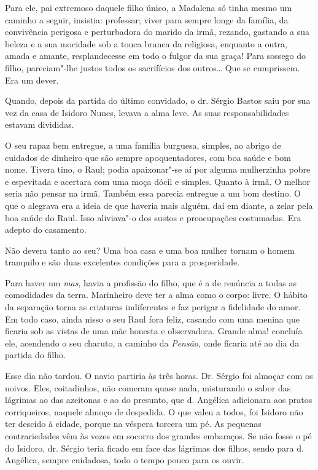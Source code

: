 Para ele, pai extremoso daquele filho único, a Madalena só tinha mesmo
um caminho a seguir, insistia: professar; viver para sempre longe da
família, da convivência perigosa e perturbadora do marido da irmã,
rezando, gastando a sua beleza e a sua mocidade sob a touca branca da
religiosa, enquanto a outra, amada e amante, resplandecesse em todo o
fulgor da sua graça! Para sossego do filho, pareciam"-lhe justos todos os
sacrifícios dos outros\ldots{} Que se cumprissem. Era um dever.

Quando, depois da partida do último convidado, o dr. Sérgio Bastos saiu
por sua vez da casa de Isidoro Nunes, levava a alma leve. As suas
responsabilidades estavam divididas.

O seu rapaz bem entregue, a uma família burguesa, simples, ao abrigo de
cuidados de dinheiro que são sempre apoquentadores, com boa saúde e bom
nome. Tivera tino, o Raul; podia apaixonar"-se aí por alguma mulherzinha
pobre e espevitada e acertara com uma moça dócil e simples. Quanto à
irmã. O melhor seria não pensar na irmã. Também essa parecia entregue a
um bom destino. O que o alegrava era a ideia de que haveria mais alguém,
daí em diante, a zelar pela boa saúde do Raul. Isso aliviava"-o dos
sustos e preocupações costumadas. Era adepto do casamento.

Não devera tanto ao seu? Uma boa casa e uma boa mulher tornam o homem
tranquilo e são duas excelentes condições para a prosperidade.

Para haver um \emph{mas}, havia a profissão do filho, que é a de
renúncia a todas as comodidades da terra. Marinheiro deve ter a alma
como o corpo: livre. O hábito da separação torna as criaturas
indiferentes e faz perigar a fidelidade do amor. Em todo caso, ainda
nisso o seu Raul fora feliz, casando com uma menina que ficaria sob as
vistas de uma mãe honesta e observadora. Grande alma! concluía ele,
acendendo o seu charuto, a caminho da \emph{Pensão}, onde ficaria até ao
dia da partida do filho.

Esse dia não tardou. O navio partiria às três horas. Dr. Sérgio foi
almoçar com os noivos. Eles, coitadinhos, não comeram quase nada,
misturando o sabor das lágrimas ao das azeitonas e ao do presunto, que
d. Angélica adicionara aos pratos corriqueiros, naquele almoço de
despedida. O que valeu a todos, foi Isidoro não ter descido à cidade,
porque na véspera torcera um pé. As pequenas contrariedades vêm às vezes
em socorro dos grandes embaraços. Se não fosse o pé do Isidoro, dr.
Sérgio teria ficado em face das lágrimas dos filhos, sendo para d.
Angélica, sempre cuidadosa, todo o tempo pouco para os ouvir.

